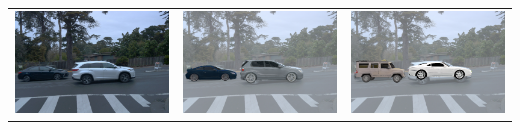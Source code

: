 \begin{table}[t]
\begin{subtable}[t]{0.485\linewidth}
{\begin{tabular}{@{}c@{\hskip .1cm}c@{\hskip .1cm}c@{}}
    \includegraphics[width=.5\columnwidth, trim={0cm 0cm 0cm 0cm},clip]{fig/rebuttal_optimization/gt/11_102_gt.png}&
    \includegraphics[width=.5\columnwidth, trim={0cm 0cm 0cm 0cm},clip]{fig/rebuttal_optimization/sched/11_102_sched.png}&
    \includegraphics[width=.5\columnwidth, trim={0cm 0cm 0cm 0cm},clip]{fig/rebuttal_optimization/no_sched/11_102_no_sched.png} \\
    

\end{tabular}}
\end{subtable}
\end{table}
